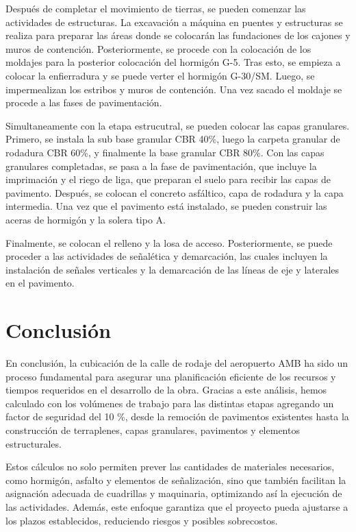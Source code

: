 \documentclass{article} %
\begin{document}
Después de completar el movimiento de tierras, se pueden comenzar las actividades de estructuras. La excavación a máquina en puentes y estructuras se realiza para preparar las áreas donde se colocarán las fundaciones de los cajones y muros de contención. Posteriormente, se procede con la colocación de los moldajes para la posterior colocación del hormigón G-5. Tras esto, se empieza a colocar la enfierradura y se puede verter el hormigón G-30/SM. Luego, se impermealizan los estribos y muros de contención. Una vez sacado el moldaje se procede a las fases de pavimentación.

Simultaneamente con la etapa estrucutral, se pueden colocar las capas granulares. Primero, se instala la sub base granular CBR 40\%, luego la carpeta granular de rodadura CBR 60\%, y finalmente la base granular CBR 80\%. Con las capas granulares completadas, se pasa a la fase de pavimentación, que incluye la imprimación y el riego de liga, que preparan el suelo para recibir las capas de pavimento. Después, se colocan el concreto asfáltico, capa de rodadura y la capa intermedia. Una vez que el pavimento está instalado, se pueden construir las aceras de hormigón y la solera tipo A.

Finalmente, se colocan el relleno y la losa de acceso. Posteriormente, se puede proceder a las actividades de señalética y demarcación, las cuales incluyen la instalación de señales verticales y la demarcación de las líneas de eje y laterales en el pavimento.

\newpage
\section{Conclusión}

En conclusión, la cubicación de la calle de rodaje del aeropuerto AMB ha sido un proceso fundamental para asegurar una planificación eficiente de los recursos y tiempos requeridos en el desarrollo de la obra. Gracias a este análisis, hemos calculado con los volúmenes de trabajo para las distintas etapas agregando un factor de seguridad del 10 \%, desde la remoción de pavimentos existentes hasta la construcción de terraplenes, capas granulares, pavimentos y elementos estructurales.

Estos cálculos no solo permiten prever las cantidades de materiales necesarios, como hormigón, asfalto y elementos de señalización, sino que también facilitan la asignación adecuada de cuadrillas y maquinaria, optimizando así la ejecución de las actividades. Además, este enfoque garantiza que el proyecto pueda ajustarse a los plazos establecidos, reduciendo riesgos y posibles sobrecostos.
\end{document}

